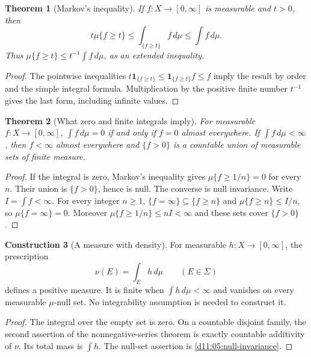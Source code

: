 \documentclass[11pt,oneside,openany]{book}
\newtheorem{theorem}{Theorem}[chapter]
\theoremstyle{definition}
\newtheorem{construction}[theorem]{Construction}
\theoremstyle{remark}
\newcommand{\one}{\mathbf1}\newcommand{\ind}[1]{\mathbf1_{#1}}
\newcommand{\Eplus}{[0,\infty]}
\newcommand{\family}[1]{}
\begin{document}
\begin{theorem}[Markov's inequality]
\family{D11.05.markov}\label{d11:05:markov}
If $f:X\to\Eplus$ is measurable and $t>0$, then
\[
 t\mu\{f\geq t\}\leq\int_{\{f\geq t\}}f\,d\mu
 \leq\int f\,d\mu.
\]
Thus $\mu\{f\geq t\}\leq t^{-1}\int f\,d\mu$, as an extended inequality.
\end{theorem}
\begin{proof}
The pointwise inequalities
$t\one_{\{f\geq t\}}\leq\one_{\{f\geq t\}}f\leq f$ imply the result
by order and the simple integral formula. Multiplication by the positive
finite number $t^{-1}$ gives the last form, including infinite values.
\end{proof}

\begin{theorem}[What zero and finite integrals imply]
\family{D11.05.zero_integral}\label{d11:05:zero-integral}
For measurable $f:X\to\Eplus$, $\int f\,d\mu=0$ if and only if $f=0$
almost everywhere. If $\int f\,d\mu<\infty$, then $f<\infty$ almost
everywhere and $\{f>0\}$ is a countable union of measurable sets of finite
measure.
\end{theorem}
\begin{proof}
If the integral is zero, Markov's inequality gives
$\mu\{f\geq1/n\}=0$ for every $n$. Their union is $\{f>0\}$, hence is
null. The converse is null invariance. Write $I=\int f<\infty$.
For every integer $n\geq1$, $\{f=\infty\}\subseteq\{f\geq n\}$ and
$\mu\{f\geq n\}\leq I/n$, so $\mu\{f=\infty\}=0$.
Moreover $\mu\{f\geq1/n\}\leq nI<\infty$ and these sets cover $\{f>0\}$.
\end{proof}

\begin{construction}[A measure with density]
\family{D11.05.weighted_measure}\label{d11:05:weighted-measure}
For measurable $h:X\to\Eplus$, the prescription
\[
 \nu(E)=\int_E h\,d\mu\qquad(E\in\Sigma)
\]
defines a positive measure. It is finite when $\int h\,d\mu<\infty$ and
vanishes on every measurable $\mu$-null set. No integrability assumption
is needed to construct it.
\end{construction}
\begin{proof}
The integral over the empty set is zero. On a countable disjoint family,
the second assertion of the nonnegative-series theorem is exactly countable
additivity of $\nu$. Its total mass is $\int h$. The null-set assertion is
\cref{d11:05:null-invariance}.
\end{proof}
\end{document}

